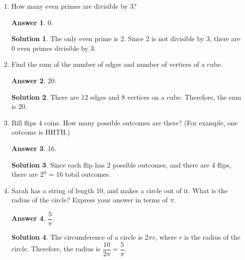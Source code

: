 \documentclass[11pt]{article}
\theoremstyle{definition}
\newtheorem*{solution}{Solution}
\newtheorem*{answer}{Answer}
\begin{document}
\begin{enumerate}

\item How many even primes are divisible by 3?

\begin{answer}
0.
\end{answer}
\begin{solution} The only even prime is 2. Since 2 is not divisible by 3, there are $\boxed{0}$ even primes divisible by 3.

\end{solution}

\item Find the sum of the number of edges and number of vertices of a cube.

\begin{answer}
20.
\end{answer}
\begin{solution} There are 12 edges and 8 vertices on a cube. Therefore, the sum is $\boxed{20}$.

\end{solution}

\item Bill flips 4 coins. How many possible outcomes are there? (For example, one outcome is HHTH.)

\begin{answer}
16.
\end{answer}
\begin{solution} Since each flip has 2 possible outcomes, and there are 4 flips, there are $2^4$ = $\boxed{16}$ total outcomes.

\end{solution}

\item Sarah has a string of length 10, and makes a circle out of it. What is the radius of the circle? Express your answer in terms of $\pi$.

\begin{answer}
$\dfrac{5}{\pi}$.
\end{answer}
\begin{solution} The circumference of a circle is $2\pi r$, where $r$ is the radius of the circle. Therefore, the radius is $\dfrac{10}{2\pi} = \boxed{\dfrac{5}{\pi}}$.
\end{solution}

\end{enumerate}
\end{document}
